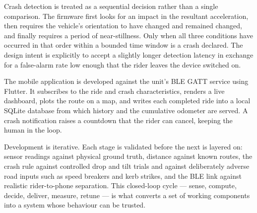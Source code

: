 \documentclass[12pt,a4paper,oneside]{report}
\begin{document}
Crash detection is treated as a sequential decision rather than a single comparison. The
firmware first looks for an impact in the resultant acceleration, then requires the vehicle's
orientation to have changed and remained changed, and finally requires a period of
near-stillness. Only when all three conditions have occurred in that order within a bounded
time window is a crash declared. The design intent is explicitly to accept a slightly
longer detection latency in exchange for a false-alarm rate low enough that the rider leaves
the device switched on.

The mobile application is developed against the unit's BLE GATT service using Flutter. It
subscribes to the ride and crash characteristics, renders a live dashboard, plots the route
on a map, and writes each completed ride into a local SQLite database from which history and
the cumulative odometer are served. A crash notification raises a countdown that the rider
can cancel, keeping the human in the loop.

Development is iterative. Each stage is validated before the next is layered on: sensor
readings against physical ground truth, distance against known routes, the crash rule
against controlled drop and tilt trials and against deliberately adverse road inputs such as
speed breakers and kerb strikes, and the BLE link against realistic rider-to-phone
separation. This closed-loop cycle --- sense, compute, decide, deliver, measure, retune ---
is what converts a set of working components into a system whose behaviour can be trusted.
\end{document}
